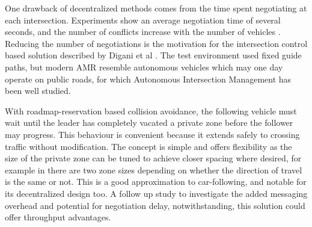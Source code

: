 \documentclass[runningheads]{llncs}
\begin{document}
One drawback of decentralized methods comes from the time spent negotiating at each intersection. Experiments show an average negotiation time of several seconds, and the number of conflicts increase with the number of vehicles \cite{Draganjac2020}. Reducing the number of negotiations is the motivation for the intersection control based solution described by Digani et al \cite{Digani2019}. The test environment used fixed guide paths, but modern AMR resemble autonomous vehicles which may one day operate on public roads, for which Autonomous Intersection Management has been well studied. 


With roadmap-reservation based collision avoidance, the following vehicle must wait until the leader has completely vacated a private zone before the follower may progress. This behaviour is convenient because it extends safely to crossing traffic without modification. The concept is simple and offers flexibility as the size of the private zone can be tuned to achieve closer spacing where desired, for example in \cite{Walenta2017} there are two zone sizes depending on whether the direction of travel is the same or not. This is a good approximation to car-following, and notable for its decentralized design too. A follow up study to investigate the added messaging overhead and potential for negotiation delay, notwithstanding, this solution could offer throughput advantages.
\end{document}

